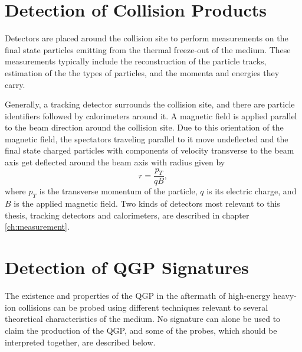 \section{Detection of Collision Products}\label{subsection:detection}
Detectors are placed around the collision site to perform measurements on the final state particles emitting from the thermal freeze-out of the medium. These measurements typically include the reconstruction of the particle tracks, estimation of the the types of particles, and the momenta and energies they carry.

Generally, a tracking detector surrounds the collision site, and there are particle identifiers followed by calorimeters around it. A magnetic field is applied parallel to the beam direction around the collision site. Due to this orientation of the magnetic field, the spectators traveling parallel to it move undeflected and the final state charged particles with components of velocity transverse to the beam axis get deflected around the beam axis with radius given by
\begin{equation}\label{eqn:larmor}
r = \frac{p_{T}}{qB},
\end{equation}
where $p_{T}$ is the transverse momentum of the particle, $q$ is its electric charge, and $B$ is the applied magnetic field.
Two kinds of detectors most relevant to this thesis, tracking detectors and calorimeters, are described in chapter \ref{ch:measurement}.

\section{Detection of QGP Signatures}\label{section:signatures}

The existence and properties of the QGP in the aftermath of high-energy heavy-ion collisions can be probed using different techniques relevant to several theoretical characteristics of the medium. No signature can alone be used to claim the production of the QGP, and some of the probes, which should be interpreted together, are described below.




